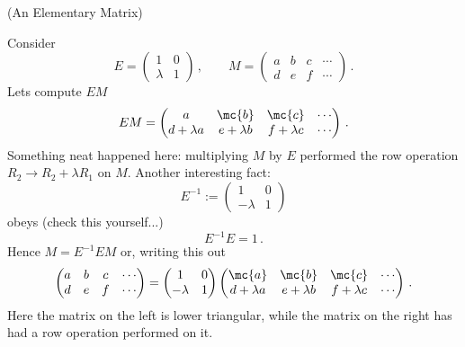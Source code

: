 \begin{example} (An Elementary Matrix)

\noindent
Consider \[E=\begin{pmatrix}1&0\\\lambda&1\end{pmatrix}\, ,\qquad M=\begin{pmatrix}a&b&c&\cdots\\d&e&f&\cdots\end{pmatrix}\, .\]
Lets compute $EM$
\[
EM=\begin{pmatrix}\multicolumn{1}{c}{a}&\mc{b}&\mc{c}&\cdots\\d+\lambda a&e+\lambda b&f+\lambda c&\cdots\end{pmatrix}\, .
\]
Something neat happened here: multiplying $M$ by $E$ performed the row operation $R_2\to R_2+\lambda R_1$ on $M$.
Another interesting fact:
\[
E^{-1}:=\begin{pmatrix}1&0\\-\lambda&1\end{pmatrix}
\] 
obeys (check this yourself...)
\[
E^{-1} E = 1\, .
\]
Hence $M=E^{-1} E M$ or, writing this out
\[
\begin{pmatrix}a&b&c&\cdots\\d&e&f&\cdots\end{pmatrix}=\begin{pmatrix}1&0\\-\lambda&1\end{pmatrix} \begin{pmatrix}\mc{a}&\mc{b}&\mc{c}&\cdots\\d+\lambda a&e+\lambda b&f+\lambda c&\cdots\end{pmatrix}\, .
\]
Here the matrix on the left is lower triangular, while the matrix on the right has had a row operation performed on it.
\end{example}




